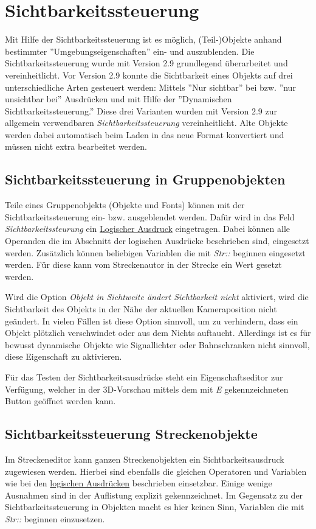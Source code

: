 \section{Sichtbarkeitssteuerung}
\label{sec:editor-obj-sichtbarkeitssteuerung}
Mit Hilfe der Sichtbarkeitssteuerung ist es möglich, (Teil-)Objekte anhand bestimmter ''Umgebungseigenschaften'' ein- und auszublenden. Die Sichtbarkeitssteuerung wurde mit Version 2.9 grundlegend überarbeitet und vereinheitlicht. Vor Version 2.9 konnte die Sichtbarkeit eines Objekts auf drei unterschiedliche Arten gesteuert werden: Mittels ''Nur sichtbar'' bei bzw. ''nur unsichtbar bei'' Ausdrücken und mit Hilfe der ''Dynamischen Sichtbarkeitssteuerung.'' Diese drei Varianten wurden mit Version 2.9 zur allgemein verwendbaren \emph{Sichtbarkeitssteuerung} vereinheitlicht. Alte Objekte werden dabei automatisch beim Laden in das neue Format konvertiert und müssen nicht extra bearbeitet werden.

\subsection{Sichtbarkeitssteuerung in Gruppenobjekten}
Teile eines Gruppenobjekts (Objekte und Fonts) können mit der Sichtbarkeitssteuerung ein- bzw. ausgeblendet werden. Dafür wird in das Feld \emph{Sichtbarkeitssteurung} ein \hyperref[sec.editor.obj.logischeausdruecke]{Logischer Ausdruck} eingetragen. Dabei können alle Operanden die im Abschnitt der logischen Ausdrücke beschrieben sind, eingesetzt werden. Zusätzlich können beliebigen Variablen die mit \emph{Str::} beginnen eingesetzt werden. Für diese kann vom Streckenautor in der Strecke ein Wert gesetzt werden.

Wird die Option \emph{Objekt in Sichtweite ändert Sichtbarkeit nicht} aktiviert, wird die Sichtbarkeit des Objekts in der Nähe der aktuellen Kameraposition nicht geändert. In vielen Fällen ist diese Option sinnvoll, um zu verhindern, dass ein Objekt plötzlich verschwindet oder aus dem Nichts auftaucht. Allerdings ist es für bewusst dynamische Objekte wie Signallichter oder Bahnschranken nicht sinnvoll, diese Eigenschaft zu aktivieren.

Für das Testen der Sichtbarkeitsausdrücke steht ein Eigenschaftseditor zur Verfügung, welcher in der 3D-Vorschau mittels dem mit \emph{E} gekennzeichneten Button geöffnet werden kann. 

\subsection{Sichtbarkeitssteuerung Streckenobjekte}
Im Streckeneditor kann ganzen Streckenobjekten ein Sichtbarkeitsausdruck zugewiesen werden. Hierbei sind ebenfalls die gleichen Operatoren und Variablen wie bei den \hyperref[sec.editor.obj.logischeausdruecke]{logischen Ausdrücken} beschrieben einsetzbar. Einige wenige Ausnahmen sind in der Auflistung explizit gekennzeichnet. Im Gegensatz zu der Sichtbarkeitssteuerung in Objekten macht es hier keinen Sinn, Variablen die mit \emph{Str::} beginnen einzusetzen.


